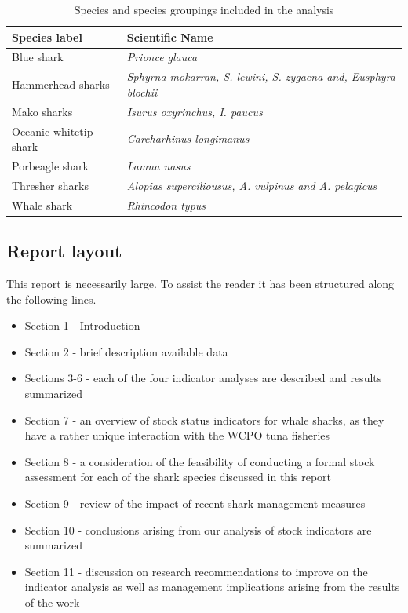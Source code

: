 \documentclass[12pt]{SCreport}
\begin{document}
\begin{table}[!h]
\label{tbl:sppgroups}
\begin{center}
\caption{Species and species groupings included in the analysis}
\begin{tabular}{l|l}
Species label & Scientific Name\\
\hline
\hline
Blue shark        &	\textit{Prionce glauca}\\
Hammerhead sharks & \textit{Sphyrna mokarran, S. lewini, S. zygaena and, Eusphyra blochii}\\
Mako sharks       & \textit{Isurus oxyrinchus, I. paucus}\\
Oceanic whitetip shark & \textit{Carcharhinus longimanus}\\
Porbeagle shark	  & \textit{Lamna nasus}\\
Thresher sharks	  & \textit{Alopias superciliousus, A. vulpinus and A. pelagicus}\\
Whale shark	      & \textit{Rhincodon typus} \\
\hline
\end{tabular} 
\end{center}
\end{table}




\subsection{Report layout}

This report is necessarily large. To assist the reader it has been structured along the following lines.
\begin{itemize}
\item Section 1 - Introduction
\item Section 2 - brief description available data
\item Sections 3-6 - each of the four indicator analyses are described and results summarized
\item Section 7 - an overview of stock status indicators for whale sharks, as they have a rather unique interaction with the WCPO tuna fisheries
\item Section 8 - a consideration of the feasibility of conducting a formal stock assessment for each of the shark species discussed in this report
\item Section 9 - review of the impact of recent shark management measures
\item Section 10 - conclusions arising from our analysis of stock indicators are summarized
\item Section 11 - discussion on research recommendations to improve on the indicator analysis as well as management implications arising from the results of the work
\end{itemize}
\end{document}
